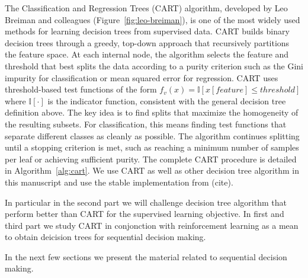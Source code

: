 The Classification and Regression Trees (CART) algorithm, developed by Leo Breiman and colleagues (Figure~\ref{fig:leo-breiman}), is one of the most widely used methods for learning decision trees from supervised data. 
CART builds binary decision trees through a greedy, top-down approach that recursively partitions the feature space. 
At each internal node, the algorithm selects the feature and threshold that best splits the data according to a purity criterion such as the Gini impurity for classification or mean squared error for regression.
CART uses threshold-based test functions of the form $f_v(x) = \mathbb{I}[x[feature] \leq threshold]$ where $\mathbb{I}[\cdot]$ is the indicator function, consistent with the general decision tree definition above. 
The key idea is to find splits that maximize the homogeneity of the resulting subsets. For classification, this means finding test functions that separate different classes as cleanly as possible. The algorithm continues splitting until a stopping criterion is met, such as reaching a minimum number of samples per leaf or achieving sufficient purity. The complete CART procedure is detailed in Algorithm~\ref{alg:cart}.
We use CART as well as other decision tree algorithm in this manuscript and use the stable implementation from (cite).

In particular in the second part we will challenge decision tree algorithm that perform better than CART for the supervised learning objective.
In first and third part we study CART in conjonction with reinforcement learning as a mean to obtain deicision trees for sequential decision making.

In the next few sections we present the material related to sequential decision making.

